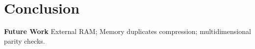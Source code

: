 \section{Conclusion}\label{sec:conclusion}

{\bf Future Work} External RAM; Memory duplicates compression; multidimensional parity checks.
